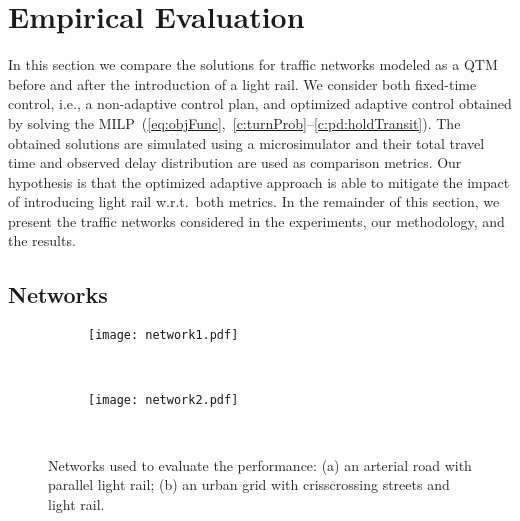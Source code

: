 \section{Empirical Evaluation}
  
In this section we compare the solutions for traffic networks modeled as a QTM
before and after the introduction of a light rail.
%
We consider both fixed-time control, i.e., a non-adaptive control plan, and
optimized adaptive control obtained by solving the
MILP~(\ref{eq:objFunc},~\ref{c:turnProb}--\ref{c:pd:holdTransit}).
%
The obtained solutions are simulated using a microsimulator and their total
travel time and observed delay distribution are used as comparison metrics.
%
Our hypothesis is that the optimized adaptive approach is able to mitigate the
impact of introducing light rail w.r.t.\ both metrics.
%
In the remainder of this section, we present the traffic networks considered in
the experiments, our methodology, and the results.






\subsection{Networks}

\begin{figure}[t!]
\centering
\begin{subfigure}{0.47\textwidth}
\label{fig:net:arterial}
\texttt{[image: network1.pdf]}
\caption{~}
\vspace{3mm}
\end{subfigure}
\begin{subfigure}{0.50\textwidth}
\label{fig:net:grid}
\texttt{[image: network2.pdf]}
\caption{~}
\end{subfigure}
\caption{Networks used to evaluate the performance:
  (a) an arterial road with parallel light rail;
  (b) an urban grid with crisscrossing streets and light rail.
%
}
\label{fig:networks}
\end{figure}


